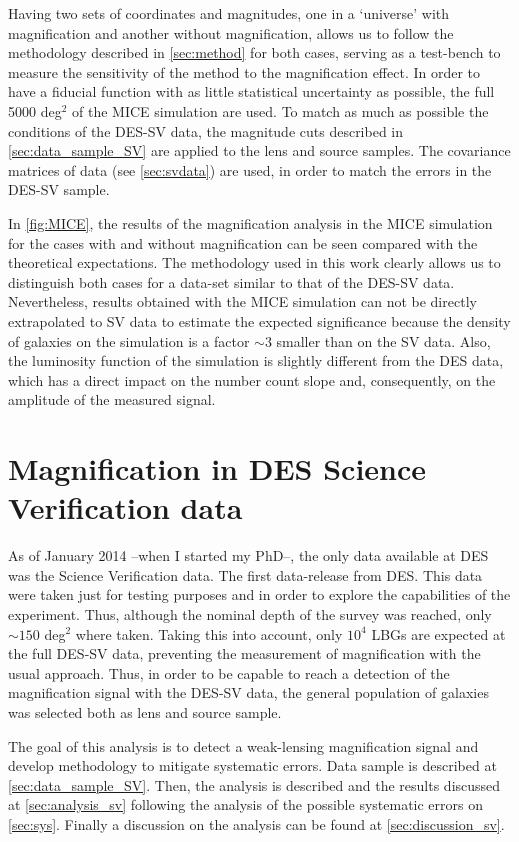 Having two sets of coordinates and magnitudes, one in a `universe' with magnification and another without magnification, allows us to follow the methodology described in \autoref{sec:method} for both cases,
serving as a test-bench to measure the sensitivity of the method to the magnification effect. In order to have a fiducial function with as little statistical uncertainty as possible, the full 5000 deg$^2$ of the MICE simulation are used. To match as much as possible the conditions of the DES-SV data, the magnitude cuts described in \autoref{sec:data_sample_SV} are applied to the lens and source samples. The covariance matrices of data (see \autoref{sec:svdata}) are used, in order to match the errors in the DES-SV sample.

In \autoref{fig:MICE}, the results of the magnification analysis in the MICE simulation for the cases with and without magnification can be seen compared with the theoretical expectations. The methodology used in this work clearly allows us to distinguish both cases for a data-set similar to that of the DES-SV data. Nevertheless, results obtained with the MICE simulation can not be directly extrapolated to SV data to estimate the expected significance because the density of galaxies on the simulation is a factor $\sim3$ smaller than on the SV data. Also, the luminosity function of the simulation is slightly different from the DES data, which has a direct impact on the number count slope and, consequently, on the amplitude of the measured signal.


\section{Magnification in DES Science Verification data}
\label{sec:svdata}
As of January 2014 --when I started my PhD--, the only data available at DES was the Science Verification data. The first data-release from DES. This data were taken just for testing purposes and in order to explore the capabilities of the experiment. Thus, although the nominal depth of the survey was reached, only $\sim 150$ deg$^2$ where taken. Taking this into account, only $10^4$ LBGs are expected at the full DES-SV data, preventing the measurement of magnification with the usual approach. Thus, in order to be capable to reach a detection of the magnification signal with the DES-SV data, the general population of galaxies was selected both as lens and source sample.
\newline

The goal of this analysis is to detect a weak-lensing magnification signal and develop methodology to mitigate systematic errors. Data sample is described at \autoref{sec:data_sample_SV}. Then, the analysis is described and the results discussed at \autoref{sec:analysis_sv} following the analysis of the possible systematic errors on \autoref{sec:sys}. Finally a discussion on the analysis can be found at \autoref{sec:discussion_sv}.

